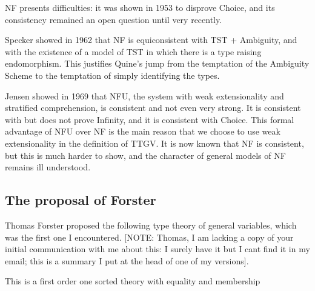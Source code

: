 \documentclass[12pt]{article}
\begin{document}
NF presents difficulties:  it was shown in 1953 to disprove Choice, and its consistency remained an open question until very recently.

Specker showed in 1962 that NF is equiconsistent with TST + Ambiguity, and with the existence of a model of TST in which there is a type raising endomorphism.  This justifies Quine's jump from the temptation of the Ambiguity Scheme to the temptation of simply identifying the types.

Jensen showed in 1969 that NFU, the system with weak extensionality and stratified comprehension, is consistent and not even very strong.  It is consistent with but does not prove Infinity, and it is consistent with Choice.  This formal advantage of NFU over NF is the main reason that we choose to use weak extensionality in the definition of TTGV.  It is now known that NF is consistent, but this is much harder to show, and the character of general models of NF remains ill understood.

\subsection{The proposal of Forster}

Thomas Forster proposed the following type theory of general variables, which was the first one I encountered.  [NOTE:  Thomas, I am lacking a copy of your initial communication with me about this:  I surely have it but I cant find it in my email;  this is a summary I put at the head of one of my versions].

This is a first order one sorted theory with equality and membership
\end{document}
